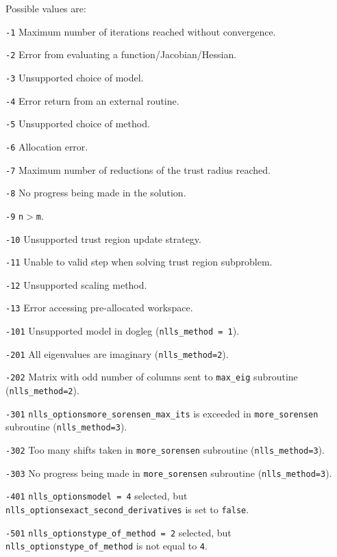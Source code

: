 
Possible values are:
\begin{description}
\item{} {\tt -1} Maximum number of iterations reached without convergence.
\item{} {\tt -2} Error from evaluating a function/Jacobian/Hessian.
\item{} {\tt -3} Unsupported choice of model.
\item{} {\tt -4} Error return from an external routine.
\item{} {\tt -5} Unsupported choice of method.
\item{} {\tt -6} Allocation error.
\item{} {\tt -7} Maximum number of reductions of the trust radius reached.
\item{} {\tt -8} No progress being made in the solution.
\item{} {\tt -9} \texttt{n}$>$\texttt{m}.
\item{} {\tt -10} Unsupported trust region update strategy.
\item{} {\tt -11} Unable to valid step when solving trust region subproblem.
\item{} {\tt -12} Unsupported scaling method.
\item{} {\tt -13} Error accessing pre-allocated workspace.
\item{} {\tt -101} Unsupported model in dogleg (\texttt{nlls\_method = 1}).
\item{} {\tt -201}  All eigenvalues are imaginary (\texttt{nlls\_method=2}).
\item{} {\tt -202} Matrix with odd number of columns sent to \texttt{max\_eig} subroutine (\texttt{nlls\_method=2}).
\item{} {\tt -301} {\tt nlls\_options\ct more\_sorensen\_max\_its} is exceeded in \texttt{more\_sorensen} subroutine (\texttt{nlls\_method=3}).
\item{} {\tt -302} Too many shifts taken in \texttt{more\_sorensen} subroutine (\texttt{nlls\_method=3}).
\item{} {\tt -303} No progress being made in \texttt{more\_sorensen} subroutine (\texttt{nlls\_method=3}).
\item{} {\tt -401} {\tt nlls\_options\ct model = 4} selected, but {\tt nlls\_options\ct exact\_second\_derivatives} is set to {\tt false}.
\item{} {\tt -501} {\tt nlls\_options\ct type\_of\_method = 2} selected, but {\tt nlls\_options\ct type\_of\_method} is not equal to {\tt 4}.
\end{description}
